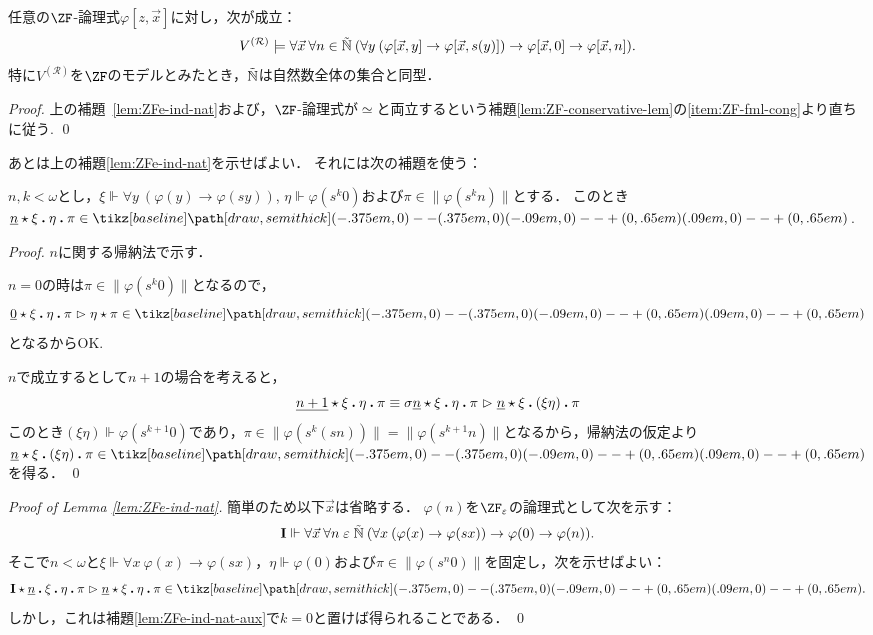 \documentclass[realisability.tex]{subfiles}
\begin{document}
\begin{corollary}
 任意の$\ZF$-論理式$\varphi[z, \vec{x}]$に対し，次が成立：
 \[
  V^{(\mathcal{R})} \models \forall \vec{x}\: \forall n \in \mathord{\tilde{\mathbb{N}}} \:(\forall y\: (\varphi[\vec{x}, y] \to \varphi[\vec{x}, s(y)]) \to \varphi[\vec{x}, 0] \to \varphi[\vec{x}, n]).
 \]
 特に$V^{(\mathcal{R})}$を$\ZF$のモデルとみたとき，$\mathord{\tilde{\mathbb{N}}}$は自然数全体の集合と同型．
\end{corollary}
\begin{proof}
 上の補題~\ref{lem:ZFe-ind-nat}および，$\ZF$-論理式が$\simeq$と両立するという補題\ref{lem:ZF-conservative-lem}の\ref{item:ZF-fml-cong}より直ちに従う. \qed
\end{proof}
あとは上の補題\ref{lem:ZFe-ind-nat}を示せばよい．
それには次の補題を使う：
\begin{lemma}\label{lem:ZFe-ind-nat-aux}
 $n, k < \omega$とし，$\xi \Vdash \forall y\: (\varphi(y) \to \varphi(s y))$, $\eta \Vdash \varphi(s^k 0)$および$\pi \in \|\varphi(s^k n)\|$とする．
 このとき$\KVM{{{\num n}} \xi \eta \pi} \in \pole$.
\end{lemma}
\begin{proof}
 $n$に関する帰納法で示す．

 $n = 0$の時は$\pi \in \|\varphi(s^k 0)\|$となるので，
 \[
  \KVM{{{\num 0}} \xi \eta \pi} \redsto \KVM{\eta \pi} \in \pole
 \]
 となるからOK.

 $n$で成立するとして$n + 1$の場合を考えると，
 \[
  \KVM{{{\num{n+1}}} \xi \eta \pi} \equiv
  \KVM{{\sigma \num{n}} \xi \eta \pi} \redsto
  \KVM{{{\num{n}}} \xi {(\xi \eta)} \pi}
 \]
 このとき$(\xi\eta) \Vdash \varphi(s^{k+1} 0)$であり，$\pi \in \|\varphi(s^k(s n))\| = \|\varphi(s^{k+1} n)\|$となるから，帰納法の仮定より$\KVM{{{\num{n}}} \xi {(\xi \eta)} \pi} \in \pole$を得る． \qed
\end{proof}

\begin{proof}[Proof of Lemma \ref{lem:ZFe-ind-nat}]
 簡単のため以下$\vec{x}$は省略する．
 $\varphi(n)$を$\ZF_{\varepsilon}$の論理式として次を示す：
  \[
  \mathsf{\mathbf{I}} \Vdash \forall \vec{x}\: \forall n \mathrel{\varepsilon} \mathord{\tilde{\mathbb{N}}} \:(\forall x\: (\varphi(x) \to \varphi(sx)) \to \varphi(0) \to \varphi(n)).
 \]
 そこで$n < \omega$と$\xi \Vdash \forall x \: \varphi(x) \to \varphi(s x)$，$\eta \Vdash \varphi(0)$および$\pi \in \|\varphi(s^n 0)\|$を固定し，次を示せばよい：
 \[
  \KVM{{\I}{{\num{n}}} \xi\eta {\pi}} \redsto
  \KVM{{{\num{n}}} \xi \eta \pi} \in \pole.
 \]
 しかし，これは補題\ref{lem:ZFe-ind-nat-aux}で$k = 0$と置けば得られることである． \qed
\end{proof}
\end{document}
